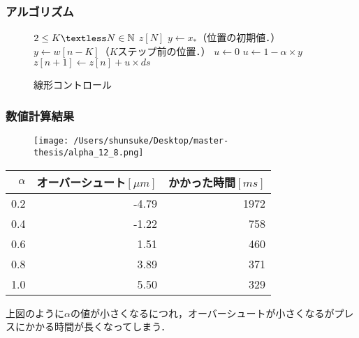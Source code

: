 \documentclass [dvipdfmx] {jsarticle}
\numberwithin{equation}{section}
\theoremstyle{definition} %
\theoremstyle{definition} %
\begin{document}
\subsubsection{アルゴリズム}
\begin{figure}[h]
    \begin{algorithm}[H]
        \caption{線形コントロール}
        \label{alg1}
        \begin{algorithmic}[1]    
        \REQUIRE $2\le K \textless N\in\mathbb{N}$
        \ENSURE $z[N]$
        \STATE $y \leftarrow x_\ast$（位置の初期値．）
        \ELSE
        \STATE $y \leftarrow w[n-K]$（$K$ステップ前の位置．）
        \ENDIF
        \STATE $u \leftarrow 0$
        \ELSE
        \STATE $u \leftarrow 1-\alpha \times y$
        \ENDIF
        \STATE $z[n+1]\leftarrow z[n]+u\times ds$
        \ENDFOR
        \end{algorithmic}
    \end{algorithm}
\end{figure}
\newpage
\subsubsection{数値計算結果}
\begin{figure}[h]
\begin{center}
\texttt{[image: /Users/shunsuke/Desktop/master-thesis/alpha\_12\_8.png]}
\caption{}
\end{center}
\end{figure}

\begin{table}[h]
    \label{table:colortbl}
    \centering
    \begin{tabular}{|r|r|r|}
     \hline
     $\alpha$ & オーバーシュート$[\mu m]$ & かかった時間$[ms]$  \\
     \hline
     0.2 & -4.79 & 1972 \\
     0.4 & -1.22 & 758 \\
     0.6 & 1.51 & 460 \\
     0.8 & 3.89 & 371 \\
     1.0 & 5.50 & 329 \\
     \hline
    \end{tabular}
\end{table}
  
上図のように$\alpha$の値が小さくなるにつれ，オーバーシュートが小さくなるがプレスにかかる時間が長くなってしまう．
\newpage
\end{document}
